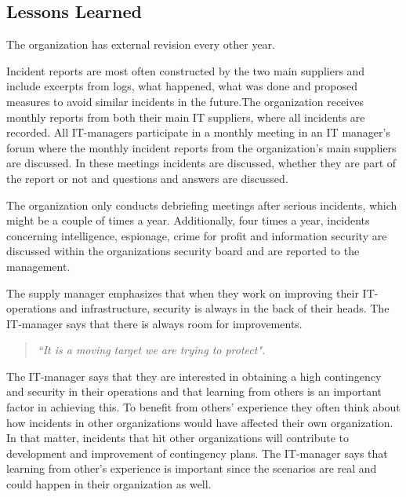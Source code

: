 \subsection{Lessons Learned}
The organization has external revision every other year.

Incident reports are most often constructed by the two main suppliers and include excerpts from logs, what happened, what was done and proposed measures to avoid similar incidents in the future.The organization receives monthly reports from both their main IT suppliers, where all incidents are recorded. All IT-managers participate in a monthly meeting in an IT manager's forum where the monthly incident reports from the organization's main suppliers are discussed. In these meetings incidents are discussed, whether they are part of the report or not and questions and answers are discussed.

The organization only conducts debriefing meetings after serious incidents, which might be a couple of times a year. Additionally, four times a year, incidents concerning intelligence, espionage, crime for profit and information security are discussed within the organizations security board and are reported to the management. 

The supply manager emphasizes that when they work on improving their IT-operations and infrastructure, security is always in the back of their heads. The IT-manager says that there is always room for improvements. 
\begin{quote}
\textit{``It is a moving target we are trying to protect".}
\end{quote}

The IT-manager says that they are interested in obtaining a high contingency and security in their operations and that learning from others is an important factor in achieving this. To benefit from others' experience they often think about how incidents in other organizations would have affected their own organization. In that matter, incidents that hit other organizations will contribute to development and improvement of contingency plans. The IT-manager says that learning from other's experience is important since the scenarios are real and could happen in their organization as well.